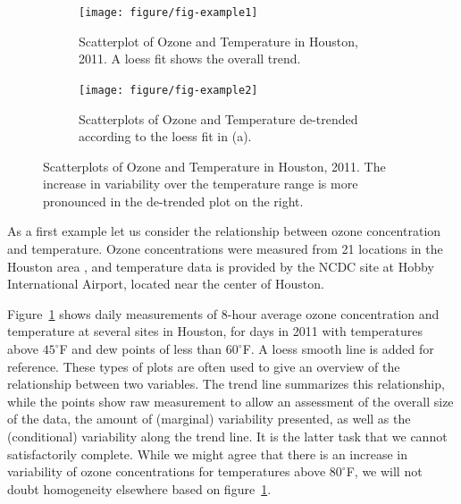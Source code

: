 \documentclass[12pt]{article}\usepackage[]{graphicx}\usepackage[]{color}
\newcommand{\done}[2][inline]{\todo[color=SpringGreen, #1]{#2}}  %
\begin{document}
\begin{figure}[h!tbp]\centering
\begin{subfigure}[b]{.52\linewidth}
  \centering
  \texttt{[image: figure/fig-example1]}
  \caption{\small Scatterplot of Ozone and Temperature in Houston, 2011. A loess fit shows the overall trend.}
  \label{fig:example1}
\end{subfigure}\hfill
\begin{subfigure}[b]{.44\linewidth}
  \centering
  \texttt{[image: figure/fig-example2]}
  \caption{\small Scatterplots of Ozone and Temperature de-trended according to the loess fit in (a). }
  \label{fig:example2}
\end{subfigure}
\caption{\label{fig:exampleFull1} Scatterplots of Ozone and Temperature in Houston, 2011. The increase in variability over the temperature range is more pronounced in the de-trended plot on the right.}
\end{figure}

As a first example let us consider the relationship between ozone concentration and temperature. Ozone concentrations were measured from 21 locations in the Houston area \citep{epa}, and temperature data is provided by the NCDC \citep{noaa} site at Hobby International Airport, located near the center of Houston. 

Figure~\ref{fig:example1} shows daily measurements of 8-hour average ozone concentration and temperature at several sites in Houston, for days in 2011 with temperatures above $45^\circ$F  and dew points of less than $60^\circ$F.
A loess smooth line is added for reference. 
These types of plots are often used to give an overview of the relationship between two variables. The trend line summarizes this relationship, while the points show raw measurement to allow an assessment of the overall size of the data, the amount of (marginal) variability presented, as well as the (conditional) variability along the trend line. It is the latter task that we cannot satisfactorily complete. While we might agree that there is an increase in variability of ozone concentrations for temperatures above $80^\circ$F, we will not doubt homogeneity  elsewhere based on figure~\ref{fig:example1}. 

% 
\end{document}
